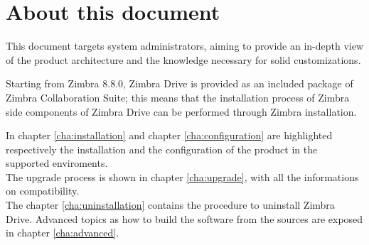 \section{About this document}
This document targets system administrators, aiming to provide an in-depth view of the product architecture
and the knowledge necessary for solid customizations.
\begin{info}
    Starting from Zimbra 8.8.0, Zimbra Drive is provided as an included package of Zimbra Collaboration Suite;
    this means that the installation process of Zimbra side components of Zimbra Drive can be performed 
    through Zimbra installation.
\end{info}
In chapter \ref{cha:installation} and chapter \ref{cha:configuration} are highlighted respectively the installation
and the configuration of the product in the supported enviroments.\\
The upgrade process is shown in chapter \ref{cha:upgrade}, with all the informations on compatibility.\\
The chapter \ref{cha:uninstallation} contains the procedure to uninstall Zimbra Drive.
Advanced topics as how to build the software from the sources are exposed in chapter \ref{cha:advanced}.